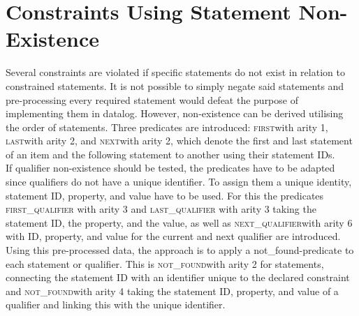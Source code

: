 \documentclass[hyperref,bachelorofscience,fleqn]{cgvpub}
\begin{document}
\section{Constraints Using Statement Non-Existence}\label{sec_constraints_using_statement_non}
Several constraints are violated if specific statements do not exist in relation to constrained statements. It is not possible to simply negate said statements and pre-processing every required statement would defeat the purpose of implementing them in datalog. However, non-existence can be derived utilising the order of statements. Three predicates are introduced: \textsc{first}with arity 1, \textsc{last}with arity 2, and \textsc{next}with arity 2, which denote the first and last statement of an item and the following statement to another using their statement IDs.\\

If qualifier non-existence should be tested, the predicates have to be adapted since qualifiers do not have a unique identifier. To assign them a unique identity, statement ID, property, and value have to be used. For this the predicates \textsc{first\_qualifier} with arity 3 and \textsc{last\_qualifier} with arity 3 taking the statement ID, the property, and the value, as well as \textsc{next\_qualifier}with arity 6 with ID, property, and value for the current and next qualifier are introduced.\\

Using this pre-processed data, the approach is to apply a not\_found-predicate to each statement or qualifier. This is \textsc{not\_found}with arity 2 for statements, connecting the statement ID with an identifier unique to the declared constraint and \textsc{not\_found}with arity 4 taking the statement ID, property, and value of a qualifier and linking this with the unique identifier.\\
\end{document}
